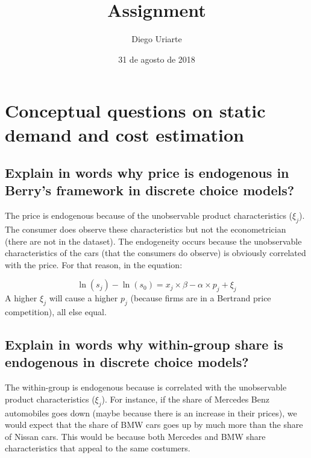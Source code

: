 \documentclass[]{article}
\title{Assignment}
\author{Diego Uriarte}
\date{31 de agosto de 2018}
\begin{document}
\maketitle

\hypertarget{conceptual-questions-on-static-demand-and-cost-estimation}{%
\section{Conceptual questions on static demand and cost
estimation}\label{conceptual-questions-on-static-demand-and-cost-estimation}}

\hypertarget{explain-in-words-why-price-is-endogenous-in-berrys-framework-in-discrete-choice-models}{%
\subsection{Explain in words why price is endogenous in Berry's
framework in discrete choice
models?}\label{explain-in-words-why-price-is-endogenous-in-berrys-framework-in-discrete-choice-models}}

The price is endogenous because of the unobservable product
characteristics (\(\xi_j\)). The consumer does observe these
characteristics but not the econometrician (there are not in the
dataset). The endogeneity occurs because the unobservable
characteristics of the cars (that the consumers do observe) is obviously
correlated with the price. For that reason, in the equation:

\[ \ln(s_j) - \ln(s_0) = x_j \times \beta - \alpha \times p_j + \xi_j\]
A higher \(\xi_j\) will cause a higher \(p_j\) (because firms are in a
Bertrand price competition), all else equal.

\hypertarget{explain-in-words-why-within-group-share-is-endogenous-in-discrete-choice-models}{%
\subsection{Explain in words why within-group share is endogenous in
discrete choice
models?}\label{explain-in-words-why-within-group-share-is-endogenous-in-discrete-choice-models}}

The within-group is endogenous because is correlated with the
unobservable product characteristics (\(\xi_j\)). For instance, if the
share of Mercedes Benz automobiles goes down (maybe because there is an
increase in their prices), we would expect that the share of BMW cars
goes up by much more than the share of Nissan cars. This would be
because both Mercedes and BMW share characteristics that appeal to the
same costumers.
\end{document}
